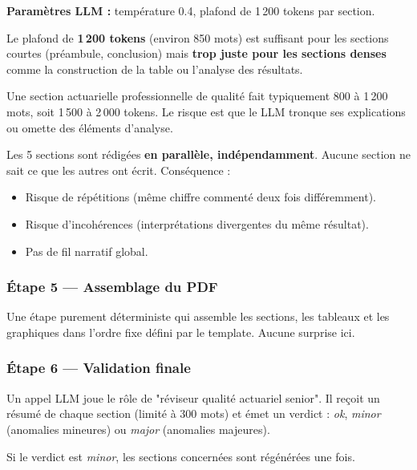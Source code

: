 \documentclass[12pt,a4paper]{article}
\begin{document}
\textbf{Paramètres LLM :} température 0.4, plafond de 1\,200 tokens par section.

\begin{blockerbox}
Le plafond de \textbf{1\,200 tokens} (environ 850 mots) est suffisant pour les
sections courtes (préambule, conclusion) mais \textbf{trop juste pour les sections
denses} comme la construction de la table ou l'analyse des résultats.

Une section actuarielle professionnelle de qualité fait typiquement 800 à
1\,200 mots, soit 1\,500 à 2\,000 tokens. Le risque est que le LLM tronque ses
explications ou omette des éléments d'analyse.
\end{blockerbox}

\begin{blockerbox}
Les 5 sections sont rédigées \textbf{en parallèle, indépendamment}.
Aucune section ne sait ce que les autres ont écrit. Conséquence :
\begin{itemize}[leftmargin=1.5em, itemsep=0pt]
  \item Risque de répétitions (même chiffre commenté deux fois différemment).
  \item Risque d'incohérences (interprétations divergentes du même résultat).
  \item Pas de fil narratif global.
\end{itemize}
\end{blockerbox}

\subsubsection{Étape 5 — Assemblage du PDF}

Une étape purement déterministe qui assemble les sections, les tableaux et
les graphiques dans l'ordre fixe défini par le template. Aucune surprise ici.

\subsubsection{Étape 6 — Validation finale}

Un appel LLM joue le rôle de "réviseur qualité actuariel senior". Il reçoit
un résumé de chaque section (limité à 300 mots) et émet un verdict :
\textit{ok}, \textit{minor} (anomalies mineures) ou \textit{major} (anomalies majeures).

Si le verdict est \textit{minor}, les sections concernées sont régénérées
une fois.
\end{document}
